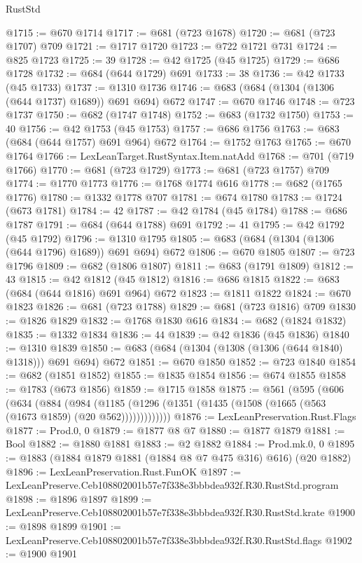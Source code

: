 \begin{lexlean}{RustStd}
\begin{coremodule}
@1715 := @670 @1714
@1717 := @681 (@723 @1678)
@1720 := @681 (@723 @1707) @709
@1721 := @1717 @1720
@1723 := @722 @1721 @731
@1724 := @825 @1723
@1725 := 39
@1728 := @42 @1725 (@45 @1725)
@1729 := @686 @1728
@1732 := @684 (@644 @1729) @691
@1733 := 38
@1736 := @42 @1733 (@45 @1733)
@1737 := @1310 @1736
@1746 := @683 (@684 (@1304 (@1306 (@644 @1737) @1689)) @691 @694) @672
@1747 := @670 @1746
@1748 := @723 @1737
@1750 := @682 (@1747 @1748)
@1752 := @683 (@1732 @1750)
@1753 := 40
@1756 := @42 @1753 (@45 @1753)
@1757 := @686 @1756
@1763 := @683 (@684 (@644 @1757) @691 @964) @672
@1764 := @1752 @1763
@1765 := @670 @1764
@1766 := LexLeanTarget.RustSyntax.Item.natAdd
@1768 := @701 (@719 @1766)
@1770 := @681 (@723 @1729)
@1773 := @681 (@723 @1757) @709
@1774 := @1770 @1773
@1776 := @1768 @1774 @616
@1778 := @682 (@1765 @1776)
@1780 := @1332 @1778 @707
@1781 := @674 @1780
@1783 := @1724 (@673 @1781)
@1784 := 42
@1787 := @42 @1784 (@45 @1784)
@1788 := @686 @1787
@1791 := @684 (@644 @1788) @691
@1792 := 41
@1795 := @42 @1792 (@45 @1792)
@1796 := @1310 @1795
@1805 := @683 (@684 (@1304 (@1306 (@644 @1796) @1689)) @691 @694) @672
@1806 := @670 @1805
@1807 := @723 @1796
@1809 := @682 (@1806 @1807)
@1811 := @683 (@1791 @1809)
@1812 := 43
@1815 := @42 @1812 (@45 @1812)
@1816 := @686 @1815
@1822 := @683 (@684 (@644 @1816) @691 @964) @672
@1823 := @1811 @1822
@1824 := @670 @1823
@1826 := @681 (@723 @1788)
@1829 := @681 (@723 @1816) @709
@1830 := @1826 @1829
@1832 := @1768 @1830 @616
@1834 := @682 (@1824 @1832)
@1835 := @1332 @1834
@1836 := 44
@1839 := @42 @1836 (@45 @1836)
@1840 := @1310 @1839
@1850 := @683 (@684 (@1304 (@1308 (@1306 (@644 @1840) @1318))) @691 @694) @672
@1851 := @670 @1850
@1852 := @723 @1840
@1854 := @682 (@1851 @1852)
@1855 := @1835 @1854
@1856 := @674 @1855
@1858 := @1783 (@673 @1856)
@1859 := @1715 @1858
@1875 := @561
    (@595
      (@606
        (@634
          (@884
            (@984
              (@1185 (@1296 (@1351 (@1435 (@1508 (@1665 (@563 (@1673 @1859) (@20 @562)))))))))))))
@1876 := LexLeanPreservation.Rust.Flags
@1877 := Prod.{0, 0}
@1879 := @1877 @8 @7
@1880 := @1877 @1879
@1881 := Bool
@1882 := @1880 @1881
@1883 := @2 @1882
@1884 := Prod.mk.{0, 0}
@1895 := @1883 (@1884 @1879 @1881 (@1884 @8 @7 @475 @316) @616) (@20 @1882)
@1896 := LexLeanPreservation.Rust.FunOK
@1897 := LexLeanPreserve.Ceb108802001b57e7f338e3bbbdea932f.R30.RustStd.program
@1898 := @1896 @1897
@1899 := LexLeanPreserve.Ceb108802001b57e7f338e3bbbdea932f.R30.RustStd.krate
@1900 := @1898 @1899
@1901 := LexLeanPreserve.Ceb108802001b57e7f338e3bbbdea932f.R30.RustStd.flags
@1902 := @1900 @1901

\end{coremodule}
\end{lexlean}
